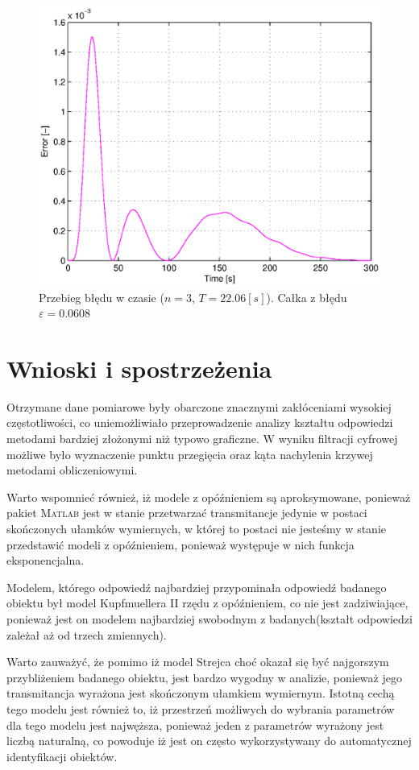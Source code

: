 \documentclass[12pt]{article}
\begin{document}
\begin{figure}[!htp]
	\begin{center}
		\includegraphics[width=13cm]{../res/img/err31.eps}
	\end{center} 
	\caption{Przebieg błędu w czasie ($n=3$, $T=22.06[s]$). Całka z błędu
	$\varepsilon=0.0608$}
\end{figure}


\newpage

\section{Wnioski i spostrzeżenia}

Otrzymane dane pomiarowe były obarczone znacznymi zakłóceniami wysokiej
częstotliwości, co uniemożliwiało przeprowadzenie analizy kształtu odpowiedzi
metodami bardziej złożonymi niż typowo graficzne. W wyniku filtracji cyfrowej
możliwe było wyznaczenie punktu przegięcia oraz kąta nachylenia krzywej
metodami obliczeniowymi.

Warto wspomnieć również, iż modele z opóźnieniem są
aproksymowane, ponieważ pakiet \textsc{Matlab} jest w stanie przetwarzać
transmitancje jedynie w postaci skończonych ułamków wymiernych, w której to
postaci nie jesteśmy w stanie przedstawić modeli z opóźnieniem, ponieważ
występuje w nich funkcja eksponencjalna.

Modelem, którego odpowiedź najbardziej przypominała odpowiedź badanego
obiektu był model Kupfmuellera II rzędu z opóźnieniem, co nie jest zadziwiające,
ponieważ jest on modelem najbardziej swobodnym z badanych(kształt odpowiedzi
zależał aż od trzech zmiennych).

Warto zauważyć, że pomimo iż model Strejca choć okazał się być najgorszym
przybliżeniem badanego obiektu, jest bardzo wygodny w analizie, ponieważ jego
transmitancja wyrażona jest skończonym ułamkiem wymiernym. Istotną cechą tego
modelu jest również to, iż przestrzeń możliwych do wybrania parametrów dla tego
modelu jest najwęższa, ponieważ jeden z parametrów wyrażony jest liczbą
naturalną, co powoduje iż jest on często wykorzystywany do automatycznej
identyfikacji obiektów.
\end{document}
